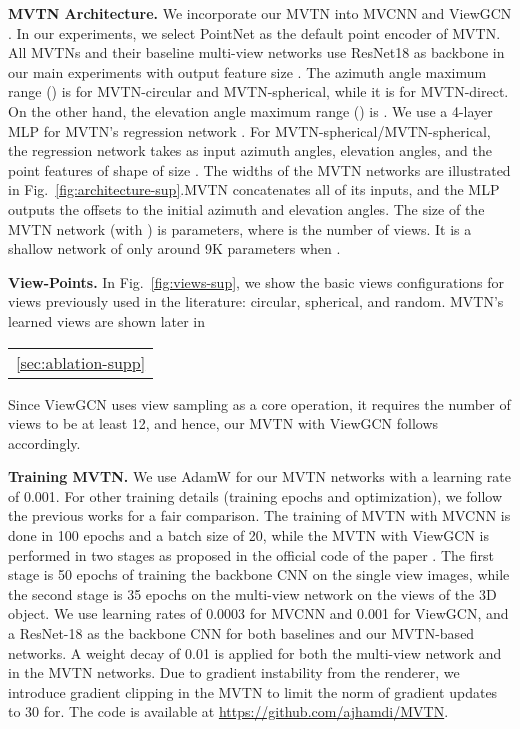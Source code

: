\documentclass[10pt,twocolumn,letterpaper]{article}
\makeatletter
\newcommand{\figLabel}{Fig.~}
\newcommand{\mysection}[1]{\noindent\textbf{#1.}}
\newcommand{\specialcell}[2][c]{\begin{tabular}[#1]{@{}c@{}}#2\end{tabular}}
\makeatother
\begin{document}
\mysection{MVTN Architecture}
We incorporate our MVTN into MVCNN \cite{mvcnn} and ViewGCN \cite{mvviewgcn}. 
In our experiments, we select PointNet \cite{pointnet} as the default point encoder of MVTN.
All MVTNs and their baseline multi-view networks use ResNet18 \cite{resnet} as backbone in our main experiments with output feature size . The azimuth angle maximum range () is   for MVTN-circular and MVTN-spherical, while it is  for MVTN-direct. On the other hand, the elevation angle maximum range () is .
We use a 4-layer MLP for MVTN's regression network . For MVTN-spherical/MVTN-spherical, the regression network takes as input  azimuth angles,  elevation angles, and the point features of shape  of size . The widths of the MVTN networks are illustrated in \figLabel{\ref{fig:architecture-sup}}.MVTN concatenates all of its inputs, and the MLP outputs the offsets to the initial  azimuth and elevation angles. The size of the MVTN network (with ) is  parameters, where  is the number of views. It is a shallow network of only around 9K parameters when .  

\mysection{View-Points}
In \figLabel{\ref{fig:views-sup}}, we show the basic views configurations for  views previously used in the literature: circular, spherical, and random. MVTN's learned views are shown later in \specialcell{\ref{sec:ablation-supp}}
Since ViewGCN uses view sampling as a core operation, it requires the number of views to be at least 12, and hence, our MVTN with ViewGCN follows accordingly. 

\mysection{Training MVTN}
We use AdamW \cite{adamw} for our MVTN networks with a learning rate of 0.001. For other training details (\eg training epochs and optimization), we follow the previous works \cite{mvviewgcn,mvcnn} for a fair comparison. The training of MVTN with MVCNN is done in 100 epochs and a batch size of 20, while the MVTN with ViewGCN is performed in two stages as proposed in the official code of the paper \cite{mvviewgcn}. The first stage is 50 epochs of training the backbone CNN on the single view images, while the second stage is 35 epochs on the multi-view network on the  views of the 3D object. We use learning rates of 0.0003 for MVCNN and 0.001 for ViewGCN, and a ResNet-18 \cite{resnet} as the backbone CNN for both baselines and our MVTN-based networks. A weight decay of 0.01 is applied for both the multi-view network and in the MVTN networks. Due to gradient instability from the renderer, we introduce gradient clipping in the MVTN to limit the  norm of gradient updates to 30 for. The code is available at \url{https://github.com/ajhamdi/MVTN}.
\end{document}
